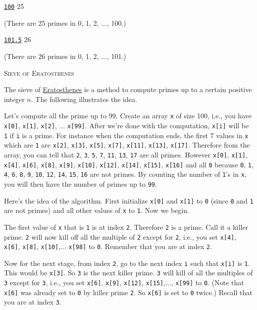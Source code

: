 \resett
\nextt
\begin{console}[commandchars=\\\{\}]
\underline{\texttt{100}}
25
\end{console}
(There are 25 primes in 0, 1, 2, ..., 100.)

\nextt
\begin{console}[commandchars=\\\{\}]
\underline{\texttt{101.5}}
26
\end{console}
(There are 26 primes in 0, 1, 2, ..., 101.)




\newpage
\textsc{Sieve of Eratosthenes}

The sieve of \href{https://en.wikipedia.org/wiki/Eratosthenes}{Eratosthenes} is a method to compute
primes up to a certain positive integer $n$.
The following illustrates the idea.

Let's compute all the prime up to 99.
Create an array \verb!x! of size 100, i.e.,
you have
\verb!x[0]!,
\verb!x[1]!,
\verb!x[2]!, ...
\verb!x[99]!.
After we're done with the computation, 
\verb!x[i]! will be \verb!1! if \verb!i! is a prime.
For instance when the computation ends,
the first 7 values in \verb!x! which are \verb!1! are
\verb!x[2]!,
\verb!x[3]!,
\verb!x[5]!,
\verb!x[7]!,
\verb!x[11]!,
\verb!x[13]!,
\verb!x[17]!.
Therefore from the array, you can tell that
\verb!2!,
\verb!3!,
\verb!5!,
\verb!7!,
\verb!11!,
\verb!13!,
\verb!17!
are all primes.
However
\verb!x[0]!,
\verb!x[1]!,
\verb!x[4]!,
\verb!x[6]!,
\verb!x[8]!,
\verb!x[9]!,
\verb!x[10]!,
\verb!x[12]!,
\verb!x[14]!,
\verb!x[15]!,
\verb!x[16]!
and all \verb!0! because
\verb!0!,
\verb!1!,
\verb!4!,
\verb!6!,
\verb!8!,
\verb!9!,
\verb!10!,
\verb!12!,
\verb!14!,
\verb!15!,
\verb!16!
are not primes.
By counting the number of \verb!1!'s in \verb!x!, you will then have
the number of primes up to \verb!99!.

Here's the idea of the algorithm.
First initialize 
\verb!x[0]! and 
\verb!x[1]! to \verb!0! (since \verb!0! and \verb!1! are not
primes)
and all other values of \verb!x! to \verb!1!.
Now we begin.

The first value of \verb!x! that is \verb!1! is at index \verb!2!.
Therefore \verb!2! is a prime.
Call it a killer prime.
\verb!2! will now kill off all the multiple of \verb!2! except for \verb!2!,
i.e.,
you set
\verb!x[4]!,
\verb!x[6]!,
\verb!x[8]!,
\verb!x[10]!,...
\verb!x[98]! to \verb!0!.
Remember that you are at index \verb!2!.

Now for the next stage, from index \verb!2!, go to the next
index \verb!i! such that \verb!x[i]! is \verb!1!.
This would be \verb!x[3]!.
So \verb!3! is the next killer prime.
\verb!3! will kill of all the multiples of \verb!3! except for \verb!3!, i.e., 
you set
\verb!x[6]!,
\verb!x[9]!,
\verb!x[12]!,
\verb!x[15]!,...,
\verb!x[99]! to \verb!0!.
(Note that \verb!x[6]! was already set to \verb!0! by
killer prime \verb!2!.
So \verb!x[6]! is set to \verb!0! twice.)
Recall that you are at index \verb!3!.


